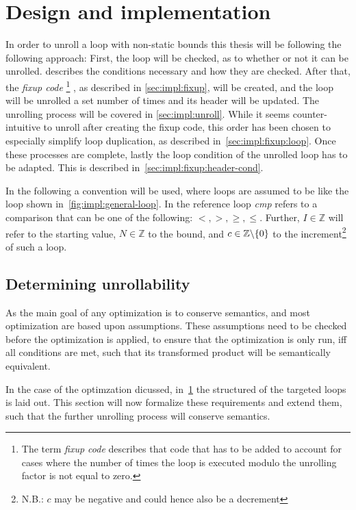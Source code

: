 \chapter{Design and implementation}\label{sec:impl}

In order to unroll a loop with non-static bounds this thesis will be following the following approach:
First, the loop will be checked, as to  whether or not it can be unrolled.
 describes the conditions necessary and how they are checked.
After that, the \textit{fixup code}
\footnote{The term \textit{fixup code} describes that code that has to be added to account for cases where the number of times the loop is executed modulo the unrolling factor is not equal to zero.}
, as described in \cref{sec:impl:fixup}, will be created, and the loop will be unrolled a set number of times and its header will be updated.
The unrolling process will be covered in \cref{sec:impl:unroll}.
While it seems counter-intuitive to unroll after creating the fixup code, this order has been chosen to especially simplify loop duplication, as described in~\cref{sec:impl:fixup:loop}.
Once these processes are complete, lastly the loop condition of the unrolled loop has to be adapted.
This is described in~\cref{sec:impl:fixup:header-cond}.

In the following a convention will be used, where loops are assumed to be like the loop shown in~\cref{fig:impl:general-loop}.
In the reference loop \textit{cmp} refers to a comparison that can be one of the following: $<, >, \geq, \leq$.
Further, $I \in \mathbb{Z}$ will refer to the starting value, $N \in \mathbb{Z}$ to the bound, and $c \in \mathbb{Z} \backslash \{0\}$ \label{sec:impl::def-c} to the increment\footnote{N.B.: $c$ may be negative and could hence also be a decrement} of such a loop.



\section{Determining unrollability}\label{sec:impl:unrollability}

As the main goal of any optimization is to conserve semantics, and most optimization are based upon assumptions.
These assumptions need to be checked before the optimization is applied, to ensure that the optimization is only run, iff all conditions are met, such that its transformed product will be semantically equivalent.

In the case of the optimzation dicussed, in~\cref{sec:impl} the structured of the targeted loops is laid out.
This section will now formalize these requirements and extend them, such that the further unrolling process will conserve semantics.

